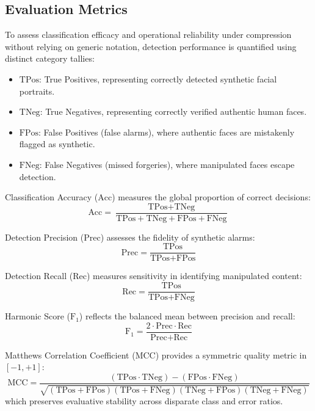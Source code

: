 \documentclass[conference]{IEEEtran}
\begin{document}
\subsection{Evaluation Metrics}
To assess classification efficacy and operational reliability under compression without relying on generic notation, detection performance is quantified using distinct category tallies:
\begin{itemize}
    \item $\text{TPos}$: True Positives, representing correctly detected synthetic facial portraits.
    \item $\text{TNeg}$: True Negatives, representing correctly verified authentic human faces.
    \item $\text{FPos}$: False Positives (false alarms), where authentic faces are mistakenly flagged as synthetic.
    \item $\text{FNeg}$: False Negatives (missed forgeries), where manipulated faces escape detection.
\end{itemize}

Classification Accuracy ($\text{Acc}$) measures the global proportion of correct decisions:
\begin{equation}
\text{Acc} = \frac{\text{TPos} + \text{TNeg}}{\text{TPos} + \text{TNeg} + \text{FPos} + \text{FNeg}}
\end{equation}

Detection Precision ($\text{Prec}$) assesses the fidelity of synthetic alarms:
\begin{equation}
\text{Prec} = \frac{\text{TPos}}{\text{TPos} + \text{FPos}}
\end{equation}

Detection Recall ($\text{Rec}$) measures sensitivity in identifying manipulated content:
\begin{equation}
\text{Rec} = \frac{\text{TPos}}{\text{TPos} + \text{FNeg}}
\end{equation}

Harmonic Score ($\text{F}_1$) reflects the balanced mean between precision and recall:
\begin{equation}
\text{F}_1 = \frac{2 \cdot \text{Prec} \cdot \text{Rec}}{\text{Prec} + \text{Rec}}
\end{equation}

Matthews Correlation Coefficient ($\text{MCC}$) provides a symmetric quality metric in $[-1, +1]$:
\begin{equation}
\text{MCC} = \frac{(\text{TPos} \cdot \text{TNeg}) - (\text{FPos} \cdot \text{FNeg})}{\sqrt{(\text{TPos} + \text{FPos})(\text{TPos} + \text{FNeg})(\text{TNeg} + \text{FPos})(\text{TNeg} + \text{FNeg})}}
\end{equation}
which preserves evaluative stability across disparate class and error ratios.
\end{document}
